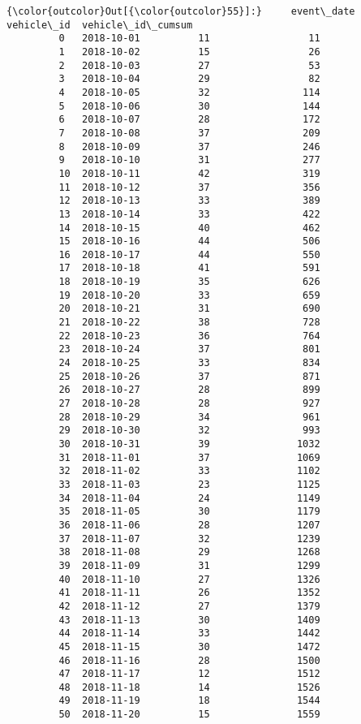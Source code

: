 \documentclass[11pt]{article}
\begin{document}
\begin{Verbatim}[commandchars=\\\{\}]
{\color{outcolor}Out[{\color{outcolor}55}]:}     event\_date  vehicle\_id  vehicle\_id\_cumsum
         0   2018-10-01          11                 11
         1   2018-10-02          15                 26
         2   2018-10-03          27                 53
         3   2018-10-04          29                 82
         4   2018-10-05          32                114
         5   2018-10-06          30                144
         6   2018-10-07          28                172
         7   2018-10-08          37                209
         8   2018-10-09          37                246
         9   2018-10-10          31                277
         10  2018-10-11          42                319
         11  2018-10-12          37                356
         12  2018-10-13          33                389
         13  2018-10-14          33                422
         14  2018-10-15          40                462
         15  2018-10-16          44                506
         16  2018-10-17          44                550
         17  2018-10-18          41                591
         18  2018-10-19          35                626
         19  2018-10-20          33                659
         20  2018-10-21          31                690
         21  2018-10-22          38                728
         22  2018-10-23          36                764
         23  2018-10-24          37                801
         24  2018-10-25          33                834
         25  2018-10-26          37                871
         26  2018-10-27          28                899
         27  2018-10-28          28                927
         28  2018-10-29          34                961
         29  2018-10-30          32                993
         30  2018-10-31          39               1032
         31  2018-11-01          37               1069
         32  2018-11-02          33               1102
         33  2018-11-03          23               1125
         34  2018-11-04          24               1149
         35  2018-11-05          30               1179
         36  2018-11-06          28               1207
         37  2018-11-07          32               1239
         38  2018-11-08          29               1268
         39  2018-11-09          31               1299
         40  2018-11-10          27               1326
         41  2018-11-11          26               1352
         42  2018-11-12          27               1379
         43  2018-11-13          30               1409
         44  2018-11-14          33               1442
         45  2018-11-15          30               1472
         46  2018-11-16          28               1500
         47  2018-11-17          12               1512
         48  2018-11-18          14               1526
         49  2018-11-19          18               1544
         50  2018-11-20          15               1559
\end{Verbatim}
            
\end{document}
